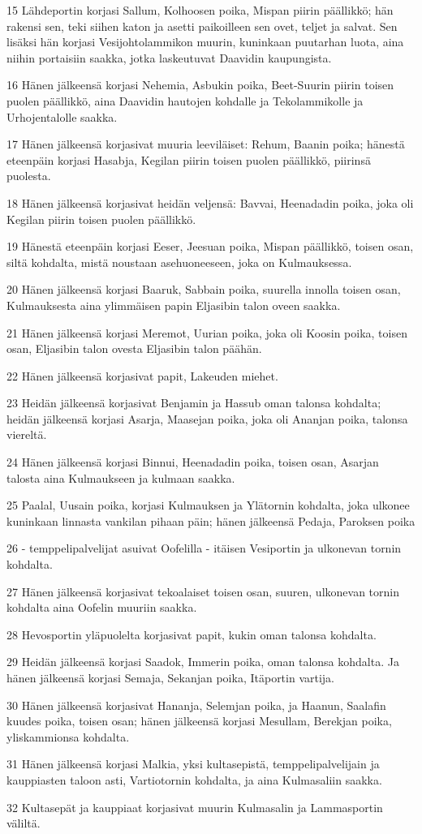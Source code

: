 \par 15 Lähdeportin korjasi Sallum, Kolhoosen poika, Mispan piirin päällikkö; hän rakensi sen, teki siihen katon ja asetti paikoilleen sen ovet, teljet ja salvat. Sen lisäksi hän korjasi Vesijohtolammikon muurin, kuninkaan puutarhan luota, aina niihin portaisiin saakka, jotka laskeutuvat Daavidin kaupungista.
\par 16 Hänen jälkeensä korjasi Nehemia, Asbukin poika, Beet-Suurin piirin toisen puolen päällikkö, aina Daavidin hautojen kohdalle ja Tekolammikolle ja Urhojentalolle saakka.
\par 17 Hänen jälkeensä korjasivat muuria leeviläiset: Rehum, Baanin poika; hänestä eteenpäin korjasi Hasabja, Kegilan piirin toisen puolen päällikkö, piirinsä puolesta.
\par 18 Hänen jälkeensä korjasivat heidän veljensä: Bavvai, Heenadadin poika, joka oli Kegilan piirin toisen puolen päällikkö.
\par 19 Hänestä eteenpäin korjasi Eeser, Jeesuan poika, Mispan päällikkö, toisen osan, siltä kohdalta, mistä noustaan asehuoneeseen, joka on Kulmauksessa.
\par 20 Hänen jälkeensä korjasi Baaruk, Sabbain poika, suurella innolla toisen osan, Kulmauksesta aina ylimmäisen papin Eljasibin talon oveen saakka.
\par 21 Hänen jälkeensä korjasi Meremot, Uurian poika, joka oli Koosin poika, toisen osan, Eljasibin talon ovesta Eljasibin talon päähän.
\par 22 Hänen jälkeensä korjasivat papit, Lakeuden miehet.
\par 23 Heidän jälkeensä korjasivat Benjamin ja Hassub oman talonsa kohdalta; heidän jälkeensä korjasi Asarja, Maasejan poika, joka oli Ananjan poika, talonsa viereltä.
\par 24 Hänen jälkeensä korjasi Binnui, Heenadadin poika, toisen osan, Asarjan talosta aina Kulmaukseen ja kulmaan saakka.
\par 25 Paalal, Uusain poika, korjasi Kulmauksen ja Ylätornin kohdalta, joka ulkonee kuninkaan linnasta vankilan pihaan päin; hänen jälkeensä Pedaja, Paroksen poika
\par 26 - temppelipalvelijat asuivat Oofelilla - itäisen Vesiportin ja ulkonevan tornin kohdalta.
\par 27 Hänen jälkeensä korjasivat tekoalaiset toisen osan, suuren, ulkonevan tornin kohdalta aina Oofelin muuriin saakka.
\par 28 Hevosportin yläpuolelta korjasivat papit, kukin oman talonsa kohdalta.
\par 29 Heidän jälkeensä korjasi Saadok, Immerin poika, oman talonsa kohdalta. Ja hänen jälkeensä korjasi Semaja, Sekanjan poika, Itäportin vartija.
\par 30 Hänen jälkeensä korjasivat Hananja, Selemjan poika, ja Haanun, Saalafin kuudes poika, toisen osan; hänen jälkeensä korjasi Mesullam, Berekjan poika, yliskammionsa kohdalta.
\par 31 Hänen jälkeensä korjasi Malkia, yksi kultasepistä, temppelipalvelijain ja kauppiasten taloon asti, Vartiotornin kohdalta, ja aina Kulmasaliin saakka.
\par 32 Kultasepät ja kauppiaat korjasivat muurin Kulmasalin ja Lammasportin väliltä.

